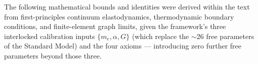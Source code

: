 The following mathematical bounds and identities were derived within the text from first-principles continuum elastodynamics, thermodynamic boundary conditions, and finite-element graph limits, given the framework's three interlocked calibration inputs $\{m_e, \alpha, G\}$ (which replace the $\sim$26 free parameters of the Standard Model) and the four axioms --- introducing zero further free parameters beyond those three.


